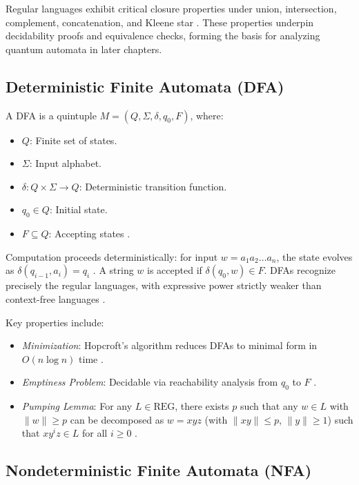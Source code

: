 Regular languages exhibit critical closure properties under union, intersection, complement, concatenation, and Kleene star \cite{hopcroft2006introduction}. These properties underpin decidability proofs and equivalence checks, forming the basis for analyzing quantum automata in later chapters. 

\subsection{Deterministic Finite Automata (DFA)}
\label{subsec:dfa} 

A DFA is a quintuple $M = (Q, \Sigma, \delta, q_0, F)$, where:
\begin{itemize}
    \item $Q$: Finite set of states.
    \item $\Sigma$: Input alphabet.
    \item $\delta: Q \times \Sigma \to Q$: Deterministic transition function.
    \item $q_0 \in Q$: Initial state.
    \item $F \subseteq Q$: Accepting states \cite{hopcroft2006introduction}.
\end{itemize} 

Computation proceeds deterministically: for input $w = a_1 a_2 \dots a_n$, the state evolves as $\delta(q_{i-1}, a_i) = q_i$ \cite{hopcroft2006introduction}. A string $w$ is accepted if $\delta(q_0, w) \in F$. DFAs recognize precisely the regular languages, with expressive power strictly weaker than context-free languages \cite{hopcroft2006introduction}. 

Key properties include:
\begin{itemize}
    \item \textit{Minimization}: Hopcroft's algorithm reduces DFAs to minimal form in $O(n \log n)$ time \cite{hopcroft2006introduction}.
    \item \textit{Emptiness Problem}: Decidable via reachability analysis from $q_0$ to $F$ \cite{hopcroft2006introduction}.
    \item \textit{Pumping Lemma}: For any $L \in \text{REG}$, there exists $p$ such that any $w \in L$ with $\|w\| \geq p$ can be decomposed as $w = xyz$ (with $\|xy\| \leq p$, $\|y\| \geq 1$) such that $xy^i z \in L$ for all $i \geq 0$ \cite{hopcroft2006introduction}.
\end{itemize} 

\subsection{Nondeterministic Finite Automata (NFA)}
\label{subsec:nfa} 

